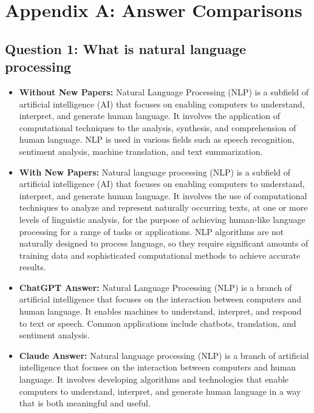 \documentclass[fleqn,moreauthors,10pt]{ds_report}
\begin{document}
\appendix
\appendix
\section*{Appendix A: Answer Comparisons}

\subsection*{Question 1: What is natural language processing}
\begin{itemize}
  \item \textbf{Without New Papers:} Natural Language Processing (NLP) is a subfield of artificial intelligence (AI) that focuses on enabling computers to understand, interpret, and generate human language. It involves the application of computational techniques to the analysis, synthesis, and comprehension of human language. NLP is used in various fields such as speech recognition, sentiment analysis, machine translation, and text summarization.
  
  \item \textbf{With New Papers:} Natural language processing (NLP) is a subfield of artificial intelligence (AI) that focuses on enabling computers to understand, interpret, and generate human language. It involves the use of computational techniques to analyze and represent naturally occurring texts, at one or more levels of linguistic analysis, for the purpose of achieving human-like language processing for a range of tasks or applications. NLP algorithms are not naturally designed to process language, so they require significant amounts of training data and sophisticated computational methods to achieve accurate results.
  
  \item \textbf{ChatGPT Answer:} Natural Language Processing (NLP) is a branch of artificial intelligence that focuses on the interaction between computers and human language. It enables machines to understand, interpret, and respond to text or speech. Common applications include chatbots, translation, and sentiment analysis.

  \item \textbf{Claude Answer:} Natural language processing (NLP) is a branch of artificial intelligence that focuses on the interaction between computers and human language. It involves developing algorithms and technologies that enable computers to understand, interpret, and generate human language in a way that is both meaningful and useful.
\end{itemize}
\end{document}
